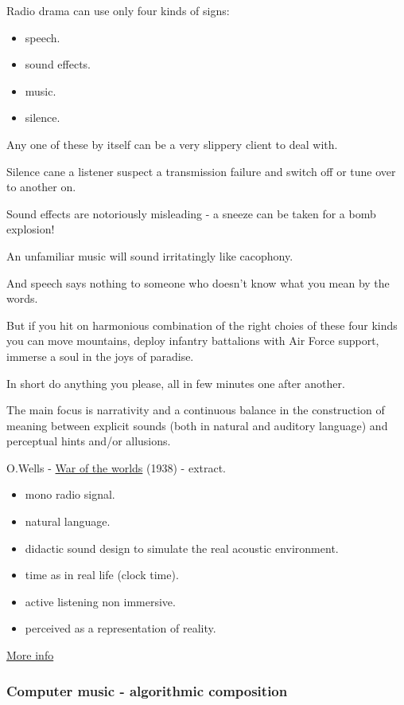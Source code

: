 Radio drama can use only four kinds of signs:

\begin{itemize}
\tightlist
\item speech.
\item sound effects.
\item music.
\item silence.
\end{itemize}

Any one of these by itself can be a very slippery client to deal with.

Silence cane a listener suspect a transmission failure and switch off or tune over to another on.

Sound effects are notoriously misleading - a sneeze can be taken for a bomb explosion!

An unfamiliar music will sound irritatingly like cacophony.

And speech says nothing to someone who doesn't know what you mean by the words.

But if you hit on harmonious combination of the right choies of these four kinds you can move mountains, deploy infantry battalions with Air Force support, immerse a soul in the joys of paradise.

In short do anything you please, all in few minutes one after another.

The main focus is narrativity and a continuous balance in the construction of meaning between explicit sounds (both in natural and auditory language) and perceptual hints and/or allusions.

O.Wells - \href{http://www.musicaecodice.it/gitmedia/emc/2_media/wells.mp3}{War of the worlds} (1938) - extract.

\begin{itemize}
\tightlist
\item mono radio signal.
\item natural language.
\item didactic sound design to simulate the real acoustic environment.
\item time as in real life (clock time).
\item active listening non immersive.
\item perceived as a representation of reality.
\end{itemize}

\href{http://www.musicaecodice.it/gitmedia/emc/2_media/radio.pdf}{More info}

\subsubsection{Computer music - algorithmic composition}\label{computer-music---algorithmic-composition}


